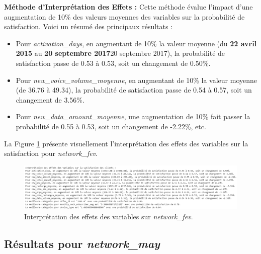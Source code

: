 \textbf{Méthode d'Interprétation des Effets :}
Cette méthode évalue l'impact d'une augmentation de 10\% des valeurs moyennes des variables sur la probabilité de satisfaction. Voici un résumé des principaux résultats :

\begin{itemize}
    \item Pour \textit{activation\_days}, en augmentant de 10\% la valeur moyenne (du \textbf{22 avril 2015} au \textbf{20 septembre 2017}20 septembre 2017), la probabilité de satisfaction passe de 0.53 à 0.53, soit un changement de 0.50\%.
    \item Pour \textit{new\_voice\_volume\_moyenne}, en augmentant de 10\% la valeur moyenne (de 36.76 à 49.34), la probabilité de satisfaction passe de 0.54 à 0.57, soit un changement de 3.56\%.
    \item Pour \textit{new\_data\_amount\_moyenne}, une augmentation de 10\% fait passer la probabilité de 0.55 à 0.53, soit un changement de -2.22\%, etc.
\end{itemize}

La Figure \ref{fig:interpretation_effets} présente visuellement l'interprétation des effets des variables sur la satisfaction pour \textit{network\_fev}.

\begin{figure}[H]
    \centering
    \includegraphics[width=0.9\linewidth]{capture_modele_35.png}
    \caption{Interprétation des effets des variables sur \textit{network\_fev}.}
    \label{fig:interpretation_effets}
\end{figure}

\subsection{Résultats pour \textit{network\_may}}

